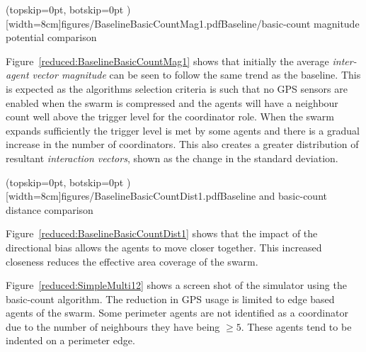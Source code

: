 \documentclass{ieeeaccess}
\begin{document}
\Figure[t!](topskip=0pt, botskip=0pt )[width=8cm]{figures/BaselineBasicCountMag1.pdf}{Baseline/basic-count magnitude potential comparison\label{reduced:BaselineBasicCountMag1}}

Figure~\ref{reduced:BaselineBasicCountMag1} shows that initially the average \textit{inter-agent vector magnitude} can be seen to follow the same trend as the baseline. This is expected as the algorithms selection criteria is such that no GPS sensors are enabled when the swarm is compressed and the agents will have a neighbour count well above the trigger level for the coordinator role. When the swarm expands sufficiently the trigger level is met by some agents and there is a gradual increase in the number of coordinators. This also creates a greater distribution of resultant \textit{interaction vectors}, shown as the change in the standard deviation. 

 
\Figure[t!](topskip=0pt, botskip=0pt )[width=8cm]{figures/BaselineBasicCountDist1.pdf}{Baseline and basic-count distance comparison\label{reduced:BaselineBasicCountDist1}}

Figure~\ref{reduced:BaselineBasicCountDist1} shows that the impact of the directional bias allows the agents to move closer together. This increased closeness reduces the effective area coverage of the swarm. 

Figure~\ref{reduced:SimpleMulti12} shows a screen shot of the simulator using the basic-count algorithm. The reduction in GPS usage is limited to edge based agents of the swarm. Some perimeter agents are not identified as a coordinator due to the number of neighbours they have being $\geq5$. These agents tend to be indented on a perimeter edge.

\end{document}
